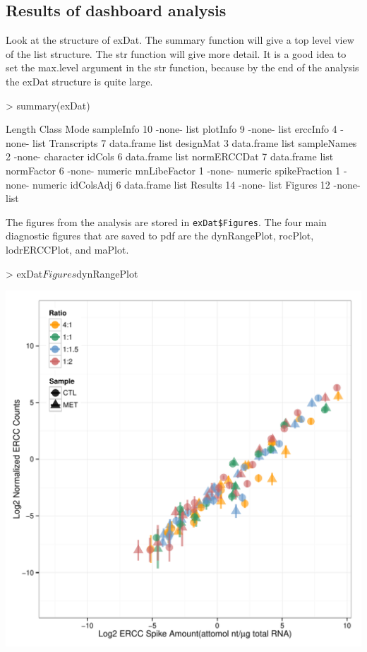 \documentclass{article}
\begin{document}
\subsection{Results of dashboard analysis}
Look at the structure of exDat. The summary function will give a top level view
of the list structure. The str function will give more detail. It is a good idea
to set the max.level argument in the str function, because by the end of the 
analysis the exDat structure is quite large.
\begin{Schunk}
\begin{Sinput}
> summary(exDat)
\end{Sinput}
\begin{Soutput}
              Length Class      Mode     
sampleInfo    10     -none-     list     
plotInfo       9     -none-     list     
erccInfo       4     -none-     list     
Transcripts    7     data.frame list     
designMat      3     data.frame list     
sampleNames    2     -none-     character
idCols         6     data.frame list     
normERCCDat    7     data.frame list     
normFactor     6     -none-     numeric  
mnLibeFactor   1     -none-     numeric  
spikeFraction  1     -none-     numeric  
idColsAdj      6     data.frame list     
Results       14     -none-     list     
Figures       12     -none-     list     
\end{Soutput}
\end{Schunk}
The figures from the analysis are stored in \verb|exDat$Figures|. The four main
diagnostic figures that are saved to pdf are the dynRangePlot, rocPlot, 
lodrERCCPlot, and maPlot.
\clearpage
\begin{center}
\begin{Schunk}
\begin{Sinput}
> exDat$Figures$dynRangePlot
\end{Sinput}
\end{Schunk}
\includegraphics{erccdashboardVignette-ratPlotA}
\end{center}
\end{document}
